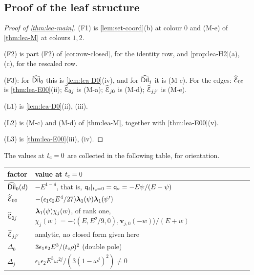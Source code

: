 \subsection{Proof of the leaf structure}\label{sec:lea-proof}

\begin{proof}[Proof of \cref{thm:lea-main}]
(F1) is \cref{lem:set-coord}(b) at colour $0$ and (M-e) of \cref{thm:lea-M} at colours $1,2$.

(F2) is part (F2) of \cref{cor:row-closed}, for the identity row, and \cref{prop:lea-H2}(a), (c), for the rescaled row.

(F3): for $\widehat{\mathsf{Dil}}_0$ this is \cref{lem:lea-D0}(iv), and for $\widehat{\mathsf{Dil}}_j$ it is (M-e). For the edges: $\widehat{\mathcal{E}}_{00}$ is \cref{thm:lea-E00}(ii); $\widehat{\mathcal{E}}_{0j}$ is (M-a); $\widehat{\mathcal{E}}_{j0}$ is (M-d); $\widehat{\mathcal{E}}_{jj'}$ is (M-e).

(L1) is \cref{lem:lea-D0}(ii), (iii).

(L2) is (M-c) and (M-d) of \cref{thm:lea-M}, together with \cref{thm:lea-E00}(v).

(L3) is \cref{thm:lea-E00}(iii), (iv).
\end{proof}

The values at $t_{\mathrm{c}}=0$ are collected in the following table, for orientation.
\begin{center}
\renewcommand{\arraystretch}{1.25}
\begin{tabular}{ll}
factor & value at $t_{\mathrm{c}}=0$\\ \hline
$\widehat{\mathsf{Dil}}_0(d)$ & $-E^{1-d}$, that is, $\mathsf{q}_{t}|_{t_{\mathrm{c}}=0}=\mathsf{q}_{\circ}=-E\psi/(E-\psi)$\\
$\widehat{\mathcal{E}}_{00}$ & $-(\epsilon_1\epsilon_2E^4/27)\boldsymbol{\lambda}_1(\psi)\boldsymbol{\lambda}_1(\psi')$\\
$\widehat{\mathcal{E}}_{0j}$ & $\boldsymbol{\lambda}_1(\psi)\chi_j(w)$, of rank one, $\chi_j(w)=-\langle(E,E^2/9,0),\mathbf{v}_{j,0}(-w)\rangle/(E+w)$\\
$\widehat{\mathcal{E}}_{jj'}$ & analytic, no closed form given here\\
$\Delta_0$ & $3\epsilon_1\epsilon_2E^3/(t_{\mathrm{c}}\rho)^2$ (double pole)\\
$\Delta_j$ & $\epsilon_1\epsilon_2E^3\omega^{2j}/(3(1-\omega^j)^2)\neq0$
\end{tabular}
\end{center}
